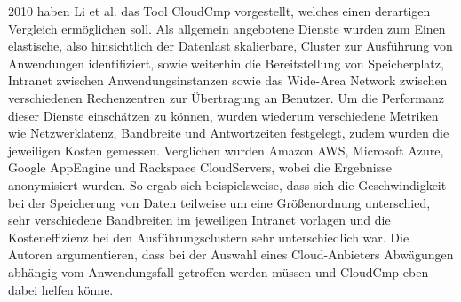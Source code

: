 %

2010 haben Li et al. das Tool CloudCmp vorgestellt\cite{li2010}, welches einen derartigen Vergleich ermöglichen soll. 
Als allgemein angebotene Dienste wurden zum Einen elastische, also hinsichtlich der Datenlast skalierbare, Cluster zur Ausführung von Anwendungen identifiziert, sowie weiterhin die Bereitstellung von Speicherplatz, Intranet zwischen Anwendungsinstanzen sowie das Wide-Area Network zwischen verschiedenen Rechenzentren zur Übertragung an Benutzer.
Um die Performanz dieser Dienste einschätzen zu können, wurden wiederum verschiedene Metriken wie Netzwerklatenz, Bandbreite und Antwortzeiten festgelegt, zudem wurden die jeweiligen Kosten gemessen.
Verglichen wurden Amazon AWS, Microsoft Azure, Google AppEngine und Rackspace CloudServers, wobei die Ergebnisse anonymisiert wurden. 
So ergab sich beispielsweise, dass sich die Geschwindigkeit bei der Speicherung von Daten teilweise um eine Größenordnung unterschied, sehr verschiedene Bandbreiten im jeweiligen Intranet vorlagen und die Kosteneffizienz bei den Ausführungsclustern sehr unterschiedlich war. 
Die Autoren argumentieren, dass bei der Auswahl eines Cloud-Anbieters Abwägungen abhängig vom Anwendungsfall getroffen werden müssen und CloudCmp eben dabei helfen könne.

